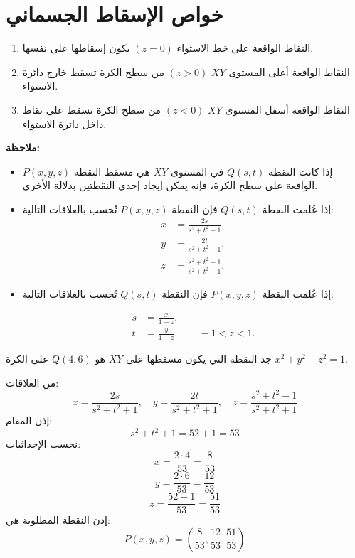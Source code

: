 \section[خواص الإسقاط الجسماني]{خواص الإسقاط الجسماني  \cite{ref6}}
\begin{enumerate}
	\item النقاط الواقعة على خط الاستواء \((z = 0)\) يكون إسقاطها على نفسها.
	\item النقاط الواقعة أعلى المستوى \(XY\) \((z > 0)\) من سطح الكرة تسقط خارج دائرة الاستواء.
	\item النقاط الواقعة أسفل المستوى \(XY\) \((z < 0)\) من سطح الكرة تسقط على نقاط داخل دائرة الاستواء.
\end{enumerate}

\textbf{ملاحظة:}
\begin{itemize}[label=\textbullet]
	\item إذا كانت النقطة \(Q(s,t)\) في المستوى \(XY\) هي مسقط النقطة \(P(x,y,z)\) الواقعة على سطح الكرة، فإنه يمكن إيجاد إحدى النقطتين بدلالة الأخرى.
	\item إذا عُلمت النقطة \(Q(s,t)\) فإن النقطة \(P(x,y,z)\) تُحسب بالعلاقات التالية:
\begin{align*}
	x &= \frac{2s}{s^2 + t^2 + 1},\\
	y &= \frac{2t}{s^2 + t^2 + 1},\\
	z &= \frac{s^2 + t^2 - 1}{s^2 + t^2 + 1}.
\end{align*}

	\item إذا عُلمت النقطة \(P(x,y,z)\) فإن النقطة \(Q(s,t)\) تُحسب بالعلاقات التالية:

\begin{align*}
	s &= \frac{x}{1 - z},\\
	t &= \frac{y}{1 - z}, \qquad -1 < z < 1.
\end{align*}
\end{itemize}

\begin{example}
	جد النقطة التي يكون مسقطها على $XY$ هو 
	$َQ(4, 6)$ على الكرة 
	$x^2 + y^2 + z^2 = 1$.
\end{example}
\begin{solution}
	من العلاقات:
	\[
	x = \frac{2s}{s^2 + t^2 + 1}, \quad
	y = \frac{2t}{s^2 + t^2 + 1}, \quad
	z = \frac{s^2 + t^2 - 1}{s^2 + t^2 + 1}
	\]
	إذن المقام:
	\[
	s^2 + t^2 + 1 = 52 + 1 = 53
	\]
	نحسب الإحداثيات:
	\[
	x = \frac{2 \cdot 4}{53} = \frac{8}{53}
	\]
	\[
	y = \frac{2 \cdot 6}{53} = \frac{12}{53}
	\]
	\[
	z = \frac{52 - 1}{53} = \frac{51}{53}
	\]
	إذن النقطة المطلوبة هي:
	\[
	P(x,y,z) = \left(\frac{8}{53}, \frac{12}{53}, \frac{51}{53}\right)
	\]
\end{solution}





